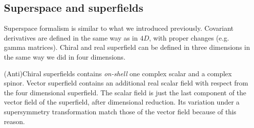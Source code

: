 \begin{appendices}
\subsection{Superspace and superfields}

Superspace formalism is similar to what we introduced previously.
Covariant derivatives are defined in the same way as in $4D$, with proper changes (e.g. gamma matrices).  
Chiral and real superfield can be defined in three dimensions in the same way we did in four dimensions. 

(Anti)Chiral superfields contains \emph{on-shell} one complex scalar and a complex spinor.
Vector superfield contains an additional real scalar field with respect from the four dimensional superfield.
The scalar field is just the last component of the vector field of the superfield, after dimensional reduction. 
Its variation under a supersymmetry transformation match those of the vector field because of this reason.





\end{appendices}